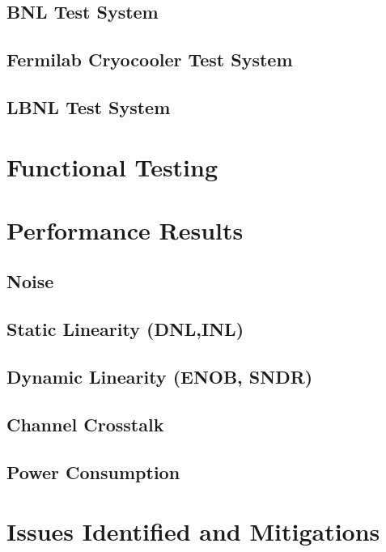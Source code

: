 \documentclass[10pt]{article}
\begin{document}
\subsection{BNL Test System }

\subsection{Fermilab Cryocooler Test System }

\subsection{LBNL Test System }


\newpage
\section{Functional Testing }


	
\newpage
\section{Performance Results}


\subsection{Noise}


\clearpage
\newpage
\subsection{Static Linearity (DNL,INL)}

\subsection{Dynamic Linearity (ENOB, SNDR)}

\clearpage
\newpage
\subsection{Channel Crosstalk }

\clearpage
\newpage
\subsection{Power Consumption }


\clearpage
\newpage
\section{Issues Identified and Mitigations}

\end{document}
